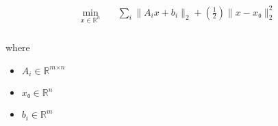 \documentclass[12pt]{article}
\begin{document}
\begin{align*}
\begin{aligned} \min_{\textit{x} \in \mathbb{R}^{ \textit{n}}} \quad & \sum_\textit{i} \|\textit{A}_{ \textit{i} }\textit{x} + \textit{b}_{ \textit{i} }\|_2 + \left( \frac{1}{2} \right)\|\textit{x} - \textit{x₀}\|_2^{2} \\
\end{aligned}
\end{align*}

where
\begin{itemize}
\item $\textit{A}_{\textit{i}} \in \mathbb{R}^{ \textit{m} \times \textit{n} }$
\item $\textit{x₀} \in \mathbb{R}^{ \textit{n}}$
\item $\textit{b}_{\textit{i}} \in \mathbb{R}^{ \textit{m}}$
\end{itemize}
\end{document}
